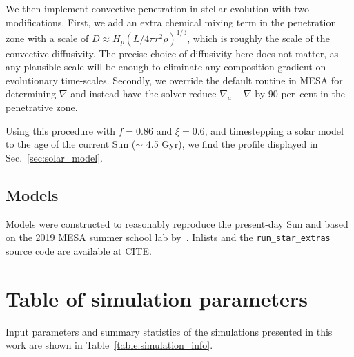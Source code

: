 \documentclass[twocolumn]{aastex631}
\begin{document}
We then implement convective penetration in stellar evolution with two modifications.
First, we add an extra chemical mixing term in the penetration zone with a scale of $D \approx H_p (L/4\pi r^2 \rho)^{1/3}$, which is roughly the scale of the convective diffusivity.
The precise choice of diffusivity here does not matter, as any plausible scale will be enough to eliminate any composition gradient on evolutionary time-scales.
Secondly, we override the default routine in MESA for determining $\nabla$ and instead have the solver reduce $\nabla_a-\nabla$ by 90 per~cent in the penetrative zone.

Using this procedure with $f = 0.86$ and $\xi = 0.6$, and timestepping a solar model to the age of the current Sun ($\sim$ 4.5 Gyr), we find the profile displayed in Sec.~\ref{sec:solar_model}.

\subsection{Models}

Models were constructed to reasonably reproduce the present-day Sun and based on the 2019 MESA summer school lab by~\citet{pm}.
Inlists and the \texttt{run\_star\_extras} source code are available at CITE.

\newpage
\section{Table of simulation parameters}
\label{app:simulation_table}
Input parameters and summary statistics of the simulations presented in this work are shown in Table~\ref{table:simulation_info}.
\end{document}
